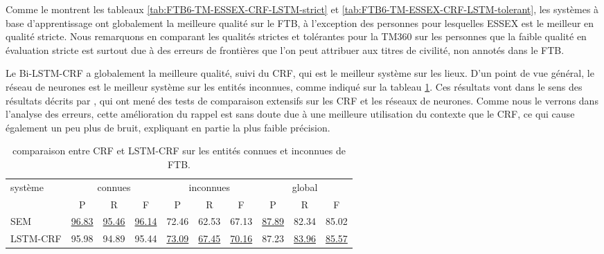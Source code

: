 \documentclass[PhD-Yoann-Dupont.tex]{subfiles}
\begin{document}
Comme le montrent les tableaux \ref{tab:FTB6-TM-ESSEX-CRF-LSTM-strict} et \ref{tab:FTB6-TM-ESSEX-CRF-LSTM-tolerant}, les systèmes à base d'apprentissage ont globalement la meilleure qualité sur le FTB, à l'exception des personnes pour lesquelles ESSEX est le meilleur en qualité stricte. Nous remarquons en comparant les qualités strictes et tolérantes pour la TM360 sur les personnes que la faible qualité en évaluation stricte est surtout due à des erreurs de frontières que l'on peut attribuer aux titres de civilité, non annotés dans le FTB.

Le Bi-LSTM-CRF a globalement la meilleure qualité, suivi du CRF, qui est le meilleur système sur les lieux. D'un point de vue général, le réseau de neurones est le meilleur système sur les entités inconnues, comme indiqué sur la tableau \ref{tab:intro-CRF-vs-LSTM}. Ces résultats vont dans le sens des résultats décrits par \citet{augenstein2017generalisation}, qui ont mené des tests de comparaison extensifs sur les CRF et les réseaux de neurones. Comme nous le verrons dans l'analyse des erreurs, cette amélioration du rappel est sans doute due à une meilleure utilisation du contexte que le CRF, ce qui cause également un peu plus de bruit, expliquant en partie la plus faible précision.

\begin{table}[ht!]
\centering
\small
\begin{tabular}{|l|ccc|ccc|ccc|}
\hline
\multirow{2}{*}{système} & \multicolumn{3}{|c|}{connues} & \multicolumn{3}{|c|}{inconnues} & \multicolumn{3}{|c|}{global}\\
                         & P     & R     & F     & P     & R     & F     & P     & R     & F   \\
\hline
SEM                      & \underline{96.83} & \underline{95.46} & \underline{96.14} & 72.46             & 62.53             & 67.13             & \underline{87.89} & 82.34             & 85.02 \\
LSTM-CRF                 & 95.98             & 94.89             & 95.44             & \underline{73.09} & \underline{67.45} & \underline{70.16} & 87.23             & \underline{83.96} & \underline{85.57} \\
\hline
\end{tabular}
\caption{comparaison entre CRF et LSTM-CRF sur les entités connues et inconnues de FTB.}
\label{tab:intro-CRF-vs-LSTM}
\end{table}
\end{document}
